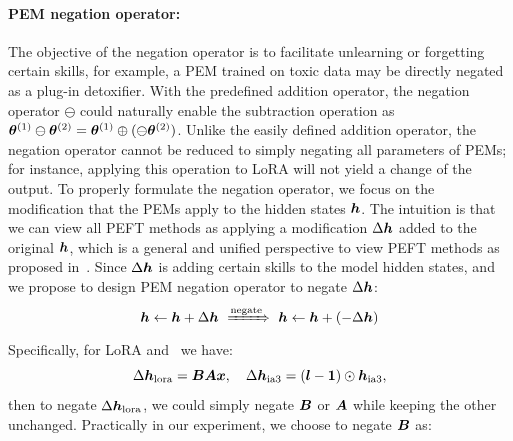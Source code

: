 \paragraph{PEM negation operator:}
The objective of the negation operator is to facilitate unlearning or forgetting certain skills, for example, a PEM trained on toxic data may be directly negated as a plug-in detoxifier. 
With the predefined addition operator, the negation operator $\ominus$ could naturally enable the subtraction operation as ${\bm{\theta}}^{(1)}\ominus{\bm{\theta}}^{(2)} = {\bm{\theta}}^{(1)}\oplus(\ominus{\bm{\theta}}^{(2)})$. 
Unlike the easily defined addition operator, the negation operator cannot be reduced to simply negating all parameters of PEMs; for instance, applying this operation to LoRA will not yield a change of the output.
To properly formulate the negation operator, we focus on the modification that the PEMs apply to the hidden states ${\bm{h}}$.
The intuition is that we can view all PEFT methods as applying a modification $\Delta {\bm{h}}$ added to the original ${\bm{h}}$, which is a general and unified perspective to view PEFT methods as proposed in~\citet{he2021towards}. 
Since $\Delta {\bm{h}}$ is adding certain skills to the model hidden states, and we propose to design PEM negation operator to negate $\Delta {\bm{h}}$: 
\begin{equation}
    \vh \leftarrow \vh + \Delta \vh \ 
    \xRightarrow{\text{negate}} \ \vh \leftarrow \vh + (-\Delta \vh)
\end{equation}
Specifically, for LoRA and \ia~we have:
\begin{equation}
    \label{eq:delta}
    \Delta {\bm{h}}_{\text{lora}} = {\bm{B}}{\bm{A}}{\bm{x}}, \quad \Delta {\bm{h}}_{\text{ia3}} = ({\bm{l}} - \mathbf{1}) \odot {\bm{h}}_{\text{ia3}},
\end{equation}  
then to negate $\Delta {\bm{h}}_{\text{lora}}$, we could simply negate ${\bm{B}}$ or ${\bm{A}}$ while keeping the other unchanged. 
Practically in our experiment, we choose to negate ${\bm{B}}$ as:
